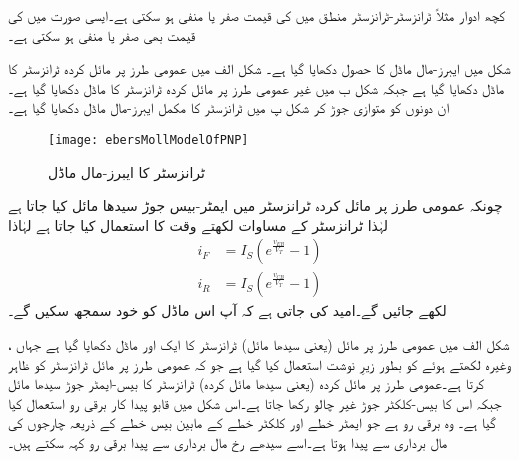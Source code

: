 کچھ ادوار مثلاً ٹرانزسٹر-ٹرانزسٹر منطق میں  کی قیمت صفر یا منفی ہو سکتی ہے۔ایسی صورت میں  کی قیمت بھی صفر یا منفی ہو سکتی ہے۔

شکل  میں ایبرز-مال ماڈل کا حصول دکھایا گیا ہے۔ شکل  الف   میں عمومی طرز پر مائل کردہ   ٹرانزسٹر کا ماڈل دکھایا گیا ہے جبکہ شکل  ب میں غیر عمومی طرز پر مائل کردہ ٹرانزسٹر کا ماڈل دکھایا گیا ہے۔ان دونوں کو متوازی جوڑ کر شکل  پ میں  ٹرانزسٹر کا مکمل ایبرز-مال ماڈل دکھایا گیا ہے۔
\begin{figure}
\centering
\texttt{[image: ebersMollModelOfPNP]}
\caption{ ٹرانزسٹر کا ایبرز-مال ماڈل}
\label{شکل_ایبر_مال_ماڈل_جمع_منفی_جمع_ٹرانزسٹر}
\end{figure}
چونکہ عمومی طرز پر مائل کردہ  ٹرانزسٹر میں ایمٹر-بیس   جوڑ سیدھا مائل کیا جاتا ہے لہٰذا   ٹرانزسٹر کے مساوات لکھتے وقت  کا استعمال کیا جاتا ہے لہٰاذا
\begin{align*}
i_F&=I_S \left (e^{\frac{v_{EB}}{V_T}}-1 \right )\\
i_R&=I_S \left (e^{\frac{v_{CB}}{V_T}}-1 \right )
\end{align*}
لکھے جائیں گے۔امید کی جاتی ہے کہ آپ اس ماڈل کو خود سمجھ سکیں گے۔

شکل  الف میں عمومی طرز پر مائل (یعنی سیدھا مائل)   ٹرانزسٹر کا ایک اور ماڈل دکھایا گیا ہے جہاں   ،  وغیرہ لکھتے ہوئے  کو بطور زیرِ نوشت استعمال کیا گیا ہے جو کہ عمومی طرز پر مائل ٹرانزسٹر کو ظاہر کرتا ہے۔عمومی طرز پر مائل کردہ (یعنی سیدھا مائل کردہ) ٹرانزسٹر  کا بیس-ایمٹر جوڑ سیدھا مائل جبکہ اس کا بیس-کلکٹر جوڑ غیر چالو رکھا جاتا ہے۔اس شکل میں قابو پیدا کار برقی رو  استعمال کیا گیا ہے۔ وہ برقی رو ہے جو ایمٹر خطے اور کلکٹر  خطے کے مابین بیس خطے کے ذریعہ چارجوں کی مال برداری سے پیدا ہوتا ہے۔اسے سیدھے رخ مال برداری سے پیدا برقی رو کہہ سکتے ہیں۔

